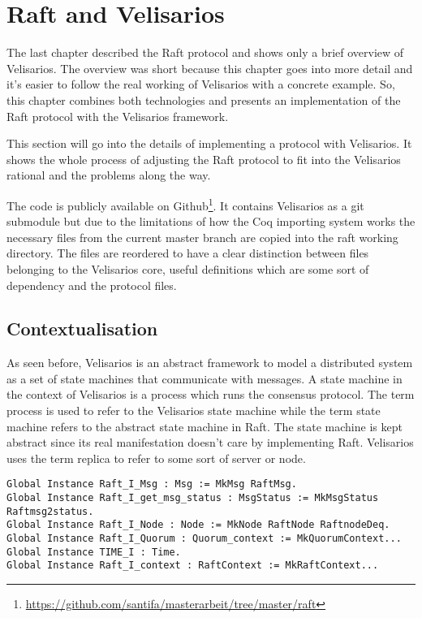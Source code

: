 %
\section{Raft and Velisarios}
\label{sec_4}

The last chapter described the Raft protocol and shows
only a brief overview of Velisarios. The overview was
short because this chapter goes into more detail
and it's easier to follow the real working of Velisarios
with a concrete example. So, this chapter combines both
technologies and presents an implementation of the Raft
protocol with the Velisarios framework.

This section will go into the details of implementing a protocol
with Velisarios. It shows the whole process of adjusting the Raft
protocol to fit into the Velisarios rational and the problems
along the way. 

The code is publicly available on
Github\footnote{\url{https://github.com/santifa/masterarbeit/tree/master/raft}}.
It contains Velisarios as a git submodule but due to the limitations of how
the Coq importing system works the necessary files from the current
master branch are copied into the raft working directory. The files
are reordered to have a clear distinction between files belonging to
the Velisarios core, useful definitions which are some sort of dependency
and the protocol files.

\subsection{Contextualisation}
As seen before, Velisarios is an abstract framework to model
a distributed system as a set of state machines that communicate
with messages. A state machine in the context of Velisarios is
a process which runs the consensus protocol. The term process is used
to refer to the Velisarios state machine while the term state
machine refers to the abstract state machine in Raft. The state
machine is kept abstract since its real manifestation doesn't care
by implementing Raft. Velisarios uses the term replica to refer
to some sort of server or node.

\begin{lstlisting}[style=coq,label=lst:abs,
caption=The abstract typeclasses used by Velisarios. The dots denote a
shortening of the definition.]
Global Instance Raft_I_Msg : Msg := MkMsg RaftMsg.
Global Instance Raft_I_get_msg_status : MsgStatus := MkMsgStatus Raftmsg2status.
Global Instance Raft_I_Node : Node := MkNode RaftNode RaftnodeDeq.
Global Instance Raft_I_Quorum : Quorum_context := MkQuorumContext...
Global Instance TIME_I : Time.
Global Instance Raft_I_context : RaftContext := MkRaftContext...
\end{lstlisting}

